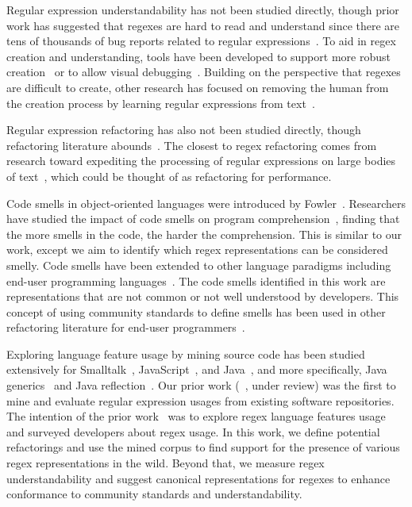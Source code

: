 Regular expression understandability has not been studied directly, though prior work has suggested that regexes are hard to read and understand since there are tens of thousands of bug reports related to regular expressions~\cite{Spishak:2012:TSR:2318202.2318207}.
To aid in regex creation and understanding,  tools have been developed to support more robust creation~\cite{Spishak:2012:TSR:2318202.2318207} or to allow visual debugging~\cite{Beck:2014:RVD:2591062.2591111}. Building on the perspective that regexes are difficult to create, other research has focused on removing the human from the creation process by learning regular expressions from  text~\cite{Babbar:2010:CBA:1871840.1871848, Li:2008:REL:1613715.1613719}.

Regular expression refactoring has also not been studied directly, though refactoring literature abounds~\cite{Mens:2004:SSR:972215.972286, Opdyke:1992:ROF:169783, Griswold:1993:AAP:152388.152389}.
The closest to regex refactoring comes from research toward  expediting the processing of regular expressions on large bodies of text~\cite{Baeza-Yates:1996:FTS:235809.235810}, which could be thought of as refactoring for performance.

Code smells in object-oriented languages were introduced by Fowler~\cite{Fowl1999}. Researchers have studied the impact of code smells on program comprehension~\cite{abbes2011empirical, du2006does}, finding that the more smells in the code, the harder the comprehension. This is similar to our work, except we aim to identify which  regex representations can be considered smelly.
Code smells have been extended to other language paradigms including end-user programming languages~\cite{Hermans2012intra, Hermans2012intraExt, stoleeicse, stoleeTSE}. The code smells identified in this work are representations that are not common or not well understood by developers. This concept of using community standards to define smells has been used in other refactoring literature  for end-user programmers~\cite{stoleeicse, stoleeTSE}.

Exploring language feature usage by mining source code has been studied extensively for
Smalltalk~\cite{Callau:2011:DUD:1985441.1985448},
JavaScript~\cite{Richards:2010:ADB:1809028.1806598},
and Java~\cite{Dyer:2014:MBA:2568225.2568295, Grechanik:2010:EIL:1852786.1852801, Parnin:2013:AUJ:2589712.2589717, Livshits:2005:RAJ:2099708.2099724},
and more specifically,
Java generics~\cite{Parnin:2013:AUJ:2589712.2589717} and
Java reflection~\cite{Livshits:2005:RAJ:2099708.2099724}.
Our prior work (~\cite{chapman2016}, under review) was the first to mine and evaluate regular expression usages from existing software repositories. The intention of the prior work~\cite{chapman2016} was to explore regex language features  usage and surveyed developers about regex usage. In this work, we define potential refactorings and use the mined corpus to find support for the presence of various regex representations in the wild. Beyond that, we measure regex understandability and suggest canonical representations for regexes to enhance conformance to community standards and understandability.




